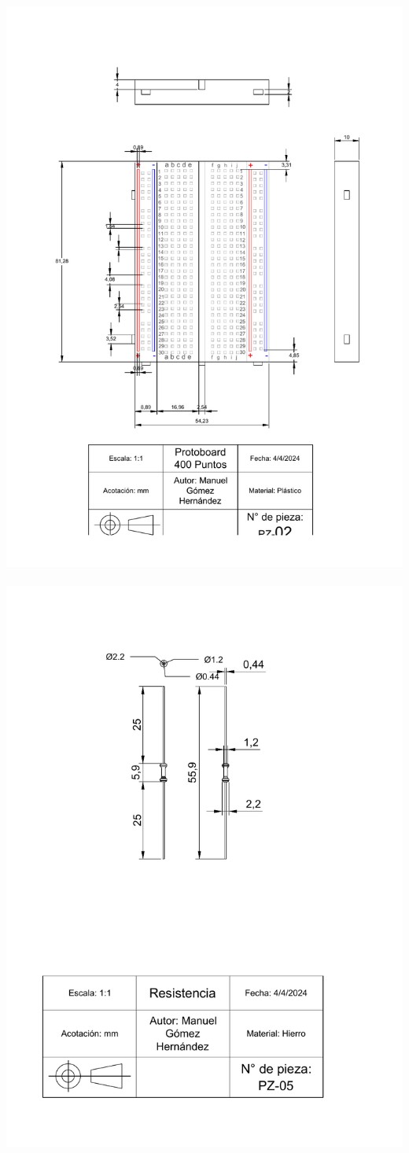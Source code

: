 \includegraphics[width=.9\textwidth]{15/img/placaProtoboardTrazo.pdf}~\\[15cm]
\includegraphics[width=.9\textwidth]{15/img/resistenciaTrazo.pdf}~\\[15cm]







